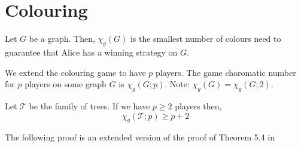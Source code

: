 \chapter{Colouring}


\begin{definition}
    Let $G$ be a graph. Then, $\chi_g(G)$ is the smallest number of colours need to guarantee that Alice has a winning strategy on $G$. 
    
\end{definition}

\begin{definition}
    We extend the colouring game to have $p$ players. The game choromatic number for $p$ players on some graph $G$ is $\chi_g(G;p)$. Note: $\chi_g(G) = \chi_g(G;2)$.
\end{definition}

\begin{theorem}
    Let $\mathcal{T}$ be the family of trees. If we have $p \geq 2$ players then,
    \[\chi_g(\mathcal{T};p) \geq p + 2 \]
\end{theorem}

The following proof is an extended version of the proof of Theorem 5.4 in \cite[Bodlaender 1990]{bodlander1990}

